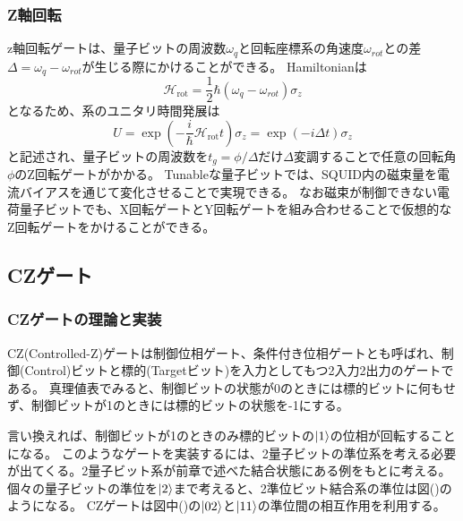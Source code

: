         \subsubsection{Z軸回転}
        z軸回転ゲートは、量子ビットの周波数$\omega_q$と回転座標系の角速度$\omega_{rot}$との差$\Delta = \omega_q-\omega_{rot}$が生じる際にかけることができる。
        Hamiltonianは
        \begin{equation}
            \mathcal{H}_{\mathrm{rot}} = \frac{1}{2} \hbar \left(\omega_q-\omega_{rot}\right)\sigma_z
        \end{equation}
        となるため、系のユニタリ時間発展は
        \begin{equation}
            U=\exp \left(-\frac{i}{\hbar} \mathcal{H}_{\mathrm{rot}} t\right)\sigma_z = \exp \left(-i\Delta t\right) \sigma_z
        \end{equation}
        と記述され、量子ビットの周波数を$t_g=\phi /\Delta$だけ$\Delta$変調することで任意の回転角$\phi$のZ回転ゲートがかかる。
        Tunableな量子ビットでは、SQUID内の磁束量を電流バイアスを通じて変化させることで実現できる。
        なお磁束が制御できない電荷量子ビットでも、X回転ゲートとY回転ゲートを組み合わせることで仮想的なZ回転ゲートをかけることができる。
        
    \subsection{CZゲート}
        \subsubsection{CZゲートの理論と実装}
        CZ(Controlled-Z)ゲートは制御位相ゲート、条件付き位相ゲートとも呼ばれ、制御(Control)ビットと標的(Targetビット)を入力としてもつ2入力2出力のゲートである。
        真理値表でみると、制御ビットの状態が0のときには標的ビットに何もせず、制御ビットが1のときには標的ビットの状態を-1にする。


        言い換えれば、制御ビットが1のときのみ標的ビットの$\ket{1}$の位相が回転することになる。
        このようなゲートを実装するには、2量子ビットの準位系を考える必要が出てくる。2量子ビット系が前章で述べた結合状態にある例をもとに考える。
        個々の量子ビットの準位を$\ket{2}$まで考えると、2準位ビット結合系の準位は図()のようになる。
        CZゲートは図中()の$\ket{02}$と$\ket{11}$の準位間の相互作用を利用する。


